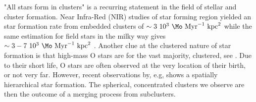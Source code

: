 "All stars form in clusters" is a recurring statement in the field of stellar and cluster formation. Near Infra-Red (NIR) studies of star forming region yielded an star formation rate from embedded clusters of $\sim 3~10^3~\Mo ~\textrm{Myr}^{-1}~ \textrm{kpc}^2$ \citep{Lada2003} while the same estimation for field stars in the milky way gives $\sim3-7~10^3~\Mo~\textrm{Myr}^{-1}~\textrm{kpc}^2$ \citep{Miller1979}. Another clue at the clustered nature of star formation is that high-mass O stars are for the vast majority, clustered, see \cite{DeWit2005}. Due to their short life, O stars are often observed at the very location of their birth, or not very far. However, recent observations by, e.g,  \cite{Gutermuth2011} shows a spatially hierarchical star formation. The spherical, concentrated clusters we observe are then the outcome of a merging process from subclusters. 




%


%


